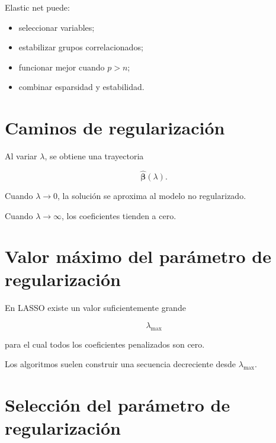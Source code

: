 \documentclass[
  spanish,
  10.5pt,
  letterpaper,
  DIV=11,
  numbers=noendperiod,
  oneside,
  open=any]{scrreprt}
\providecommand{\tightlist}{%
  \setlength{\itemsep}{0pt}\setlength{\parskip}{0pt}}
\theoremstyle{definition}
\theoremstyle{definition}
\theoremstyle{plain}
\theoremstyle{remark}
\begin{document}

Elastic net puede:

\begin{itemize}
\tightlist
\item
  seleccionar variables;
\item
  estabilizar grupos correlacionados;
\item
  funcionar mejor cuando \(p>n\);
\item
  combinar esparsidad y estabilidad.
\end{itemize}

\section*{Caminos de regularización}\label{caminos-de-regularizaciuxf3n}


Al variar \(\lambda\), se obtiene una trayectoria

\[
\widehat{\boldsymbol{\beta}}(\lambda).
\]

Cuando \(\lambda\to 0\), la solución se aproxima al modelo no
regularizado.

Cuando \(\lambda\to\infty\), los coeficientes tienden a cero.

\section*{Valor máximo del parámetro de
regularización}\label{valor-muxe1ximo-del-paruxe1metro-de-regularizaciuxf3n}


En LASSO existe un valor suficientemente grande

\[
\lambda_{\max}
\]

para el cual todos los coeficientes penalizados son cero.

Los algoritmos suelen construir una secuencia decreciente desde
\(\lambda_{\max}\).

\section*{Selección del parámetro de
regularización}\label{selecciuxf3n-del-paruxe1metro-de-regularizaciuxf3n}
\end{document}
